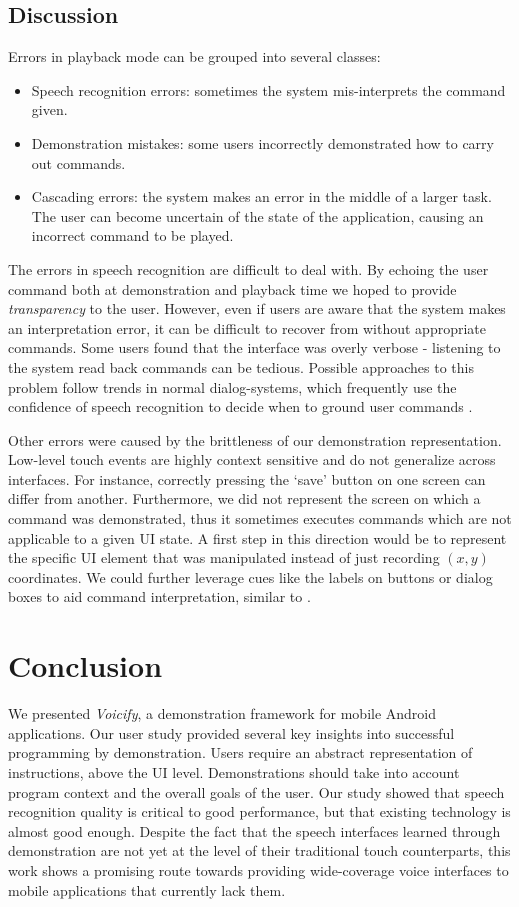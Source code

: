 \documentclass[letterpaper]{article}
\begin{document}
\subsection{Discussion}
Errors in playback mode can be
grouped into several classes:
\begin{itemize}
\item Speech recognition errors: sometimes the system mis-interprets the command given.
\item Demonstration mistakes: some users incorrectly demonstrated how to carry out commands.
\item Cascading errors: the system makes an error in the middle of a larger task. The user can become uncertain of the state of the application, causing an incorrect command to be played.
\end{itemize}
The errors in speech recognition are difficult to deal with. By echoing the user command both at demonstration and playback time we hoped to provide \emph{transparency} to the user.
However, even if users are aware that the system makes an interpretation error, it can be difficult to recover from without appropriate commands. Some users found that the
interface was overly verbose - listening to the system read back commands can be tedious. Possible approaches to this problem follow trends in normal dialog-systems, which frequently
use the confidence of speech recognition to decide when to ground user commands \cite{DBLP:journals/csl/YoungGKMSTY10}.

Other errors were caused by the brittleness of our demonstration representation. Low-level touch
events are highly context sensitive and do not generalize across interfaces. For instance,
correctly pressing the `save' button on one screen can differ from another. Furthermore, we did
not represent the screen on which a command was demonstrated, thus it sometimes executes  commands which 
are not applicable to a given UI state. A first step in this direction would be to represent the 
specific UI element that was manipulated instead of just recording $(x,y)$ coordinates. We could 
further leverage cues like the labels on buttons or dialog boxes to aid command interpretation,
similar to \cite{DBLP:conf/acl/BranavanCZB09}.



\section{Conclusion}
We presented \emph{Voicify}, a demonstration framework for mobile Android applications.
Our user study provided several key insights into successful programming by demonstration.
Users require an abstract representation of instructions, above the UI level. Demonstrations
should take into account program context and the overall goals of the user.
Our study showed that speech recognition quality is critical to good performance, but that
existing technology is almost good enough.
Despite the fact that the speech interfaces learned through demonstration are not yet at the
level of their traditional touch counterparts, this work shows a promising route
towards providing wide-coverage voice interfaces to mobile applications that currently lack them.


\end{document}
